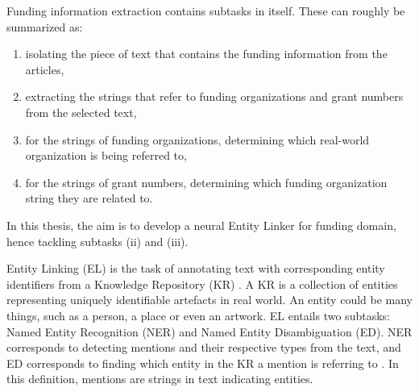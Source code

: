\documentclass{report}
\theoremstyle{definition}
\theoremstyle{remark}
\begin{document}
Funding information extraction contains subtasks in itself. These can roughly be summarized as:\vspace{0.2cm}
\renewcommand{\labelenumi}{(\roman{enumi})}
\begin{enumerate}
     \vspace{-0.3cm}\item isolating the piece of text that contains the funding information from the articles,
     \vspace{-0.6cm}\item extracting the strings that refer to funding organizations and grant numbers from the selected text,
     \vspace{-0.3cm}\item for the strings of funding organizations, determining which real-world organization is being referred to,
     \vspace{-0.3cm}\item for the strings of grant numbers, determining which funding organization string they are related to.
\end{enumerate}

\vspace{-0.3cm}\noindent In this thesis, the aim is to develop a neural Entity Linker for funding domain, hence tackling subtasks (ii) and (iii). 

Entity Linking (EL) is the task of annotating text with corresponding entity identifiers from a Knowledge Repository (KR) \cite{balog}. A KR is a collection of entities representing uniquely identifiable artefacts in real world. An entity could be many things, such as a person, a place or even an artwork. EL entails two subtasks: Named Entity Recognition (NER) and Named Entity Disambiguation (ED). NER corresponds to detecting mentions and their respective types from the text, and ED corresponds to finding which entity in the KR a mention is referring to \cite{balog}. In this definition, mentions are strings in text indicating entities.
\end{document}
